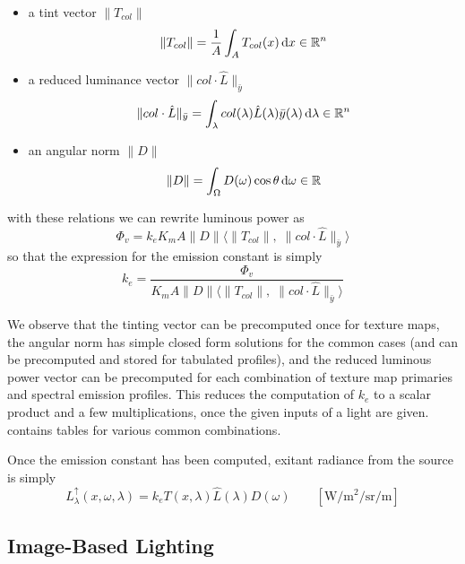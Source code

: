 \begin{itemize}
\item a tint vector $\|T_{col}\|$
\begin{equation}
\|T_{col}\|  = \frac1A\int_A T_{col}(x) \mathop{}\!\mathrm{d} x \in \mathbb{R}^n
\end{equation}
\item a reduced luminance vector $\|col \cdot \hat{L}\|_{\bar y}$
\begin{equation}
\|col \cdot \hat{L}\|_{\bar y} = \int_\lambda col(\lambda) \hat{L}(\lambda)
\bar{y}(\lambda) \mathop{}\!\mathrm{d}\lambda \in \mathbb{R}^n
\end{equation}
\item an angular norm $\|D\|$
\begin{equation}
 \|D\| = \int_\Omega D(\omega) \cos\theta \mathop{}\!\mathrm{d}\omega \in \mathbb{R}
\end{equation}
\end{itemize}
with these relations we can rewrite luminous power as
\begin{equation}
\Phi_v = k_e K_m A \|D\| \big\langle \|T_{col}\|,\; \|col\cdot \hat{L}\|_{\bar
y} \big\rangle
\end{equation}
so that the expression for the emission constant is simply
\begin{equation}
 k_e = \frac{\Phi_v}{K_m A \|D\| \big\langle \|T_{col}\|,\; \|col\cdot \hat{L}\|_{\bar y} \big\rangle }
\end{equation}

We observe that the tinting vector can be precomputed once for texture maps, the
angular norm has simple closed form solutions for the common cases (and can be
precomputed and stored for tabulated profiles), and the reduced luminous power
vector can be precomputed for each combination of texture map primaries and
spectral emission profiles.
This reduces the computation of $k_e$ to a scalar product and a few
multiplications, once the given inputs of a light are given.
 contains tables for various common combinations.

Once the emission constant has been computed, exitant radiance from the source
is simply
\begin{equation}
L^\uparrow_{\lambda}(x, \omega, \lambda) = k_e T(x, \lambda) \hat{L}(\lambda)
D(\omega)
\qquad \left[\unit{\watt\per\square\meter\per\steradian\per\meter}\right]
\end{equation}


\subsection{Image-Based Lighting}

